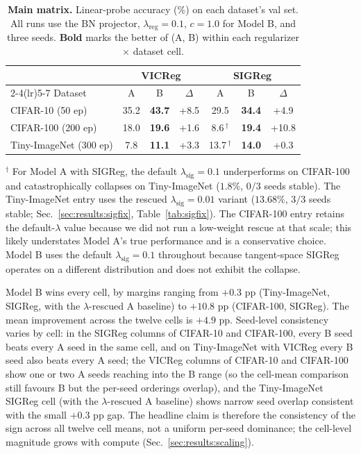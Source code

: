 \documentclass{article}
\begin{document}
\begin{table}[t]
  \centering
  \caption{\textbf{Main matrix.} Linear-probe accuracy (\%) on each dataset's val set. All runs use the BN projector, $\lambda_{\text{reg}}{=}0.1$, $c{=}1.0$ for Model B, and three seeds. \textbf{Bold} marks the better of (A, B) within each regularizer $\times$ dataset cell.}
  \label{tab:main}
  \small
  \begin{tabular}{l c c c c c c}
    \toprule
    & \multicolumn{3}{c}{VICReg} & \multicolumn{3}{c}{SIGReg} \\
    \cmidrule(lr){2-4}\cmidrule(lr){5-7}
    Dataset & A & B & $\Delta$ & A & B & $\Delta$ \\
    \midrule
    CIFAR-10 (50 ep)     & 35.2 & \textbf{43.7} & +8.5  & 29.5 & \textbf{34.4} & +4.9 \\
    CIFAR-100 (200 ep)   & 18.0 & \textbf{19.6} & +1.6  & 8.6\,$^\dagger$  & \textbf{19.4} & +10.8 \\
    Tiny-ImageNet (300 ep) & 7.8  & \textbf{11.1} & +3.3  & 13.7\,$^\dagger$ & \textbf{14.0} & +0.3 \\
    \bottomrule
  \end{tabular}
  \vspace{0.3em}

  \raggedright
  \footnotesize $^\dagger$ For Model A with SIGReg, the default $\lambda_{\text{sig}}{=}0.1$ underperforms on CIFAR-100 and catastrophically collapses on Tiny-ImageNet ($1.8\%$, $0/3$ seeds stable). The Tiny-ImageNet entry uses the rescued $\lambda_{\text{sig}}{=}0.01$ variant ($13.68\%$, $3/3$ seeds stable; Sec.~\ref{sec:results:sigfix}, Table~\ref{tab:sigfix}). The CIFAR-100 entry retains the default-$\lambda$ value because we did not run a low-weight rescue at that scale; this likely understates Model A's true performance and is a conservative choice. Model B uses the default $\lambda_{\text{sig}}{=}0.1$ throughout because tangent-space SIGReg operates on a different distribution and does not exhibit the collapse.
\end{table}

Model B wins every cell, by margins ranging from $+0.3$ pp (Tiny-ImageNet, SIGReg, with the $\lambda$-rescued A baseline) to $+10.8$ pp (CIFAR-100, SIGReg). The mean improvement across the twelve cells is $+4.9$ pp. Seed-level consistency varies by cell: in the SIGReg columns of CIFAR-10 and CIFAR-100, every B seed beats every A seed in the same cell, and on Tiny-ImageNet with VICReg every B seed also beats every A seed; the VICReg columns of CIFAR-10 and CIFAR-100 show one or two A seeds reaching into the B range (so the cell-mean comparison still favours B but the per-seed orderings overlap), and the Tiny-ImageNet SIGReg cell (with the $\lambda$-rescued A baseline) shows narrow seed overlap consistent with the small $+0.3$ pp gap. The headline claim is therefore the consistency of the sign across all twelve cell means, not a uniform per-seed dominance; the cell-level magnitude grows with compute (Sec.~\ref{sec:results:scaling}).
\end{document}
